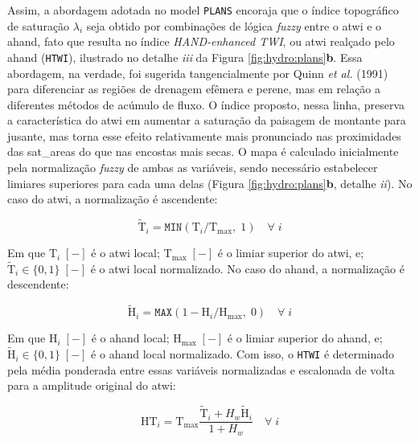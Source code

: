 \documentclass[./main.tex]{subfiles}
\begin{document}
\par Assim, a abordagem adotada no \gls{model} \texttt{PLANS} encoraja que o índice topográfico de saturação $\lambda_i$ seja obtido por combinações de lógica \textit{fuzzy} entre o \acrshort{atwi} e o \acrshort{ahand}, fato que resulta no índice \textit{HAND-enhanced TWI}, ou \acrshort{atwi} realçado pelo \acrshort{ahand} (\texttt{HTWI}), ilustrado no detalhe \textit{iii} da Figura \ref{fig:hydro:plans}\textbf{b}. Essa abordagem, na verdade, foi sugerida tangencialmente por Quinn \textit{et al.} (1991) \cite{Quinn1991b} para diferenciar as regiões de drenagem efêmera e perene, mas em relação a diferentes métodos de acúmulo de fluxo. O índice proposto, nessa linha, preserva a característica do \acrshort{atwi} em aumentar a saturação da paisagem de montante para jusante, mas torna esse efeito relativamente mais pronunciado nas proximidades das \gls{sat_areas} do que nas encostas mais secas. O mapa é calculado inicialmente pela normalização \textit{fuzzy} de ambas as variáveis, sendo necessário estabelecer limiares superiores para cada uma delas (Figura \ref{fig:hydro:plans}\textbf{b}, detalhe \textit{ii}). No caso do \acrshort{atwi}, a normalização é ascendente: 
\begin{linenomath*}
\begin{equation}
\label{eq:plans:ftwi}
\tilde{\text{T}}_i = \texttt{MIN}(\text{T}_i/\text{T}_\text{max},\; 1) \quad \forall \; i
\end{equation}
\end{linenomath*}
Em que  $\text{T}_i\;[-]$ é o \acrshort{atwi} local; $\text{T}_\text{max}\;[-]$ é o limiar superior do \acrshort{atwi}, e; $\tilde{\text{T}}_i\in \{0,1\}\;[-]$ é o \acrshort{atwi} local normalizado. No caso do \acrshort{ahand}, a normalização é descendente:
\begin{linenomath*}
\begin{equation}
\label{eq:plans:ftwi}
\tilde{\text{H}}_i = \texttt{MAX}(1 - \text{H}_i/\text{H}_\text{max},\; 0) \quad \forall \; i
\end{equation}
\end{linenomath*}
Em que  $\text{H}_i\;[-]$ é o \acrshort{ahand} local; $\text{H}_\text{max}\;[-]$ é o limiar superior do \acrshort{ahand}, e; $\tilde{\text{H}}_i\in \{0,1\}\;[-]$ é o \acrshort{ahand} local normalizado. Com isso, o \texttt{HTWI} é determinado pela média ponderada entre essas variáveis normalizadas e escalonada de volta para a amplitude original do \acrshort{atwi}:
\begin{linenomath*}
\begin{equation}
\label{eq:plans:htwi}
\text{HT}_{i} = \text{T}_\text{max} \frac{\tilde{\text{T}}_i + H_w \tilde{\text{H}}_i}{1 + H_w} \quad \forall \; i
\end{equation}
\end{linenomath*}
\end{document}
